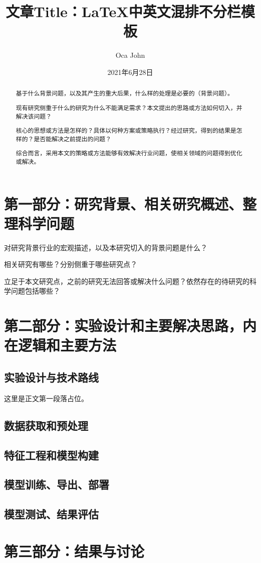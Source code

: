 \documentclass[a4paper,10pt]{article}
\title{文章Title：LaTeX中英文混排不分栏模板}
\author{Oca John}
\date{2021年6月28日}
\begin{document}
    \maketitle                      %
    
    \begin{abstract}
        
        基于什么背景问题，以及其产生的重大后果，什么样的处理是必要的（背景问题）。
        
        现有研究侧重于什么的研究为什么不能满足需求？本文提出的思路或方法如何切入，并解决该问题？
        
        核心的思想或方法是怎样的？具体以何种方案或策略执行？经过研究，得到的结果是怎样的？是否能解决之前提出的问题？
        
        综合而言，采用本文的策略或方法能够有效解决行业问题，使相关领域的问题得到优化或解决。
        
    \end{abstract}
    
    \section{第一部分：研究背景、相关研究概述、整理科学问题}
    
    对研究背景行业的宏观描述，以及本研究切入的背景问题是什么？
    
    相关研究有哪些？分别侧重于哪些研究点？
    
    立足于本文研究点，之前的研究无法回答或解决什么问题？依然存在的待研究的科学问题包括哪些？
    
    \section{第二部分：实验设计和主要解决思路，内在逻辑和主要方法}
    
    \subsection{实验设计与技术路线}
    
    这里是正文第一段落占位。
    
    \subsection{数据获取和预处理}
    
    \subsection{特征工程和模型构建}
    
    \subsection{模型训练、导出、部署}
    
    \subsection{模型测试、结果评估}
    
    \section{第三部分：结果与讨论}
    
\end{document}
